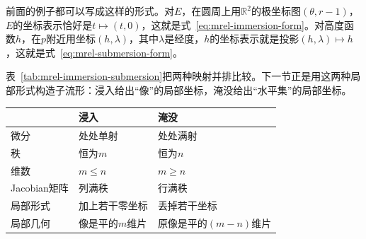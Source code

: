 前面的例子都可以写成这样的形式。对$E$，在圆周上用$\mathbb R^2$的极坐标图$(\theta,r-1)$，$E$的坐标表示恰好是$t\mapsto(t,0)$，这就是式~\eqref{eq:mrel-immersion-form}。对高度函数$h$，在$p$附近用坐标$(h,\lambda)$，其中$\lambda$是经度，$h$的坐标表示就是投影$(h,\lambda)\mapsto h$，这就是式~\eqref{eq:mrel-submersion-form}。

表~\ref{tab:mrel-immersion-submersion}把两种映射并排比较。下一节正是用这两种局部形式构造子流形：浸入给出“像”的局部坐标，淹没给出“水平集”的局部坐标。

\begin{BookInlineTable}
  \centering
  \begin{tabular}{lll}
    \toprule
    & 浸入 & 淹没\\
    \midrule
    微分 & 处处单射 & 处处满射\\
    秩 & 恒为$m$ & 恒为$n$\\
    维数 & $m\leq n$ & $m\geq n$\\
    Jacobian矩阵 & 列满秩 & 行满秩\\
    局部形式 & 加上若干零坐标 & 丢掉若干坐标\\
    局部几何 & 像是平的$m$维片 & 原像是平的$(m-n)$维片\\
    \bottomrule
  \end{tabular}
  \caption{浸入与淹没的比较。}
  \label{tab:mrel-immersion-submersion}
\end{BookInlineTable}

